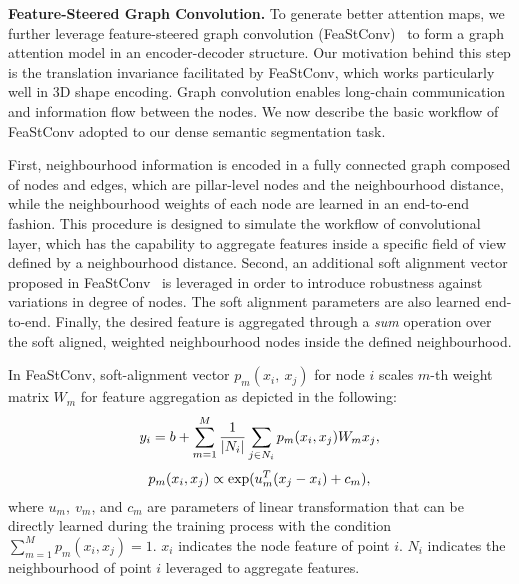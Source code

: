 \documentclass[lettersize,journal]{IEEEtran}
\begin{document}
\textbf{Feature-Steered Graph Convolution.}
To generate better attention maps, we further leverage feature-steered graph convolution (FeaStConv)~\cite{feastnet} to form a graph attention model in an encoder-decoder structure. Our motivation behind this step is the translation invariance facilitated by FeaStConv, which works particularly well in 3D shape encoding.
Graph convolution enables long-chain communication and information flow between the nodes.
We now describe the basic workflow of FeaStConv adopted to our dense semantic segmentation task.

First, neighbourhood information is encoded in a fully connected graph composed of nodes and edges, which are pillar-level nodes and the neighbourhood distance, while the neighbourhood weights of each node are learned in an end-to-end fashion. 
This procedure is designed to simulate the workflow of convolutional layer, which has the capability to aggregate features inside a specific field of view defined by a neighbourhood distance. Second, an additional soft alignment vector proposed in FeaStConv~\cite{feastnet} is leveraged in order to introduce robustness against variations in degree of nodes. The soft alignment parameters are also learned end-to-end. Finally, the desired feature is aggregated through a \emph{sum} operation over the soft aligned, weighted neighbourhood nodes inside the defined neighbourhood.

In FeaStConv, soft-alignment vector $p_m(x_i, ~x_j)$ for node $i$ scales $m$-th weight matrix $W_m$ for feature aggregation as depicted in the following:
\begin{equation}
\begin{split}
\centering
    y_i = b+ \sum_{m=1}^M\frac{1}{|N_i|}\sum_{j\in N_i}p_m(x_i,x_j)W_m x_j,
\end{split}
\end{equation}
\begin{equation}
\begin{aligned}
\centering
    p_m(x_i, x_j) \propto \mathrm{exp}(u_m^T(x_j-x_i)+c_m),
\end{aligned}
\end{equation}
where $u_m, ~v_m$, and $c_m$ are parameters of linear transformation that can be directly learned during the training process with the condition $\sum_{m=1}^M p_m(x_i, x_j)=1$. $x_i$ indicates the node feature of point $i$. $N_i$ indicates the neighbourhood of point $i$ leveraged to aggregate features.
\end{document}
